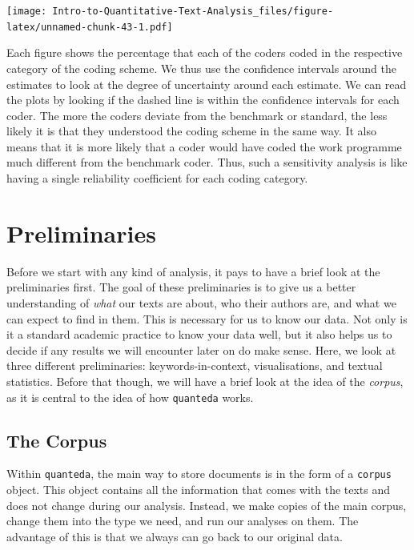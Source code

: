 \documentclass[
]{article}
\begin{document}
\texttt{[image: Intro-to-Quantitative-Text-Analysis\_files/figure-latex/unnamed-chunk-43-1.pdf]}

Each figure shows the percentage that each of the coders coded in the respective category of the coding scheme. We thus use the confidence intervals around the estimates to look at the degree of uncertainty around each estimate. We can read the plots by looking if the dashed line is within the confidence intervals for each coder. The more the coders deviate from the benchmark or standard, the less likely it is that they understood the coding scheme in the same way. It also means that it is more likely that a coder would have coded the work programme much different from the benchmark coder. Thus, such a sensitivity analysis is like having a single reliability coefficient for each coding category.

\hypertarget{preliminaries}{%
\section{Preliminaries}\label{preliminaries}}

Before we start with any kind of analysis, it pays to have a brief look at the preliminaries first. The goal of these preliminaries is to give us a better understanding of \emph{what} our texts are about, who their authors are, and what we can expect to find in them. This is necessary for us to know our data. Not only is it a standard academic practice to know your data well, but it also helps us to decide if any results we will encounter later on do make sense. Here, we look at three different preliminaries: keywords-in-context, visualisations, and textual statistics. Before that though, we will have a brief look at the idea of the \emph{corpus}, as it is central to the idea of how \texttt{quanteda} works.

\hypertarget{the-corpus}{%
\subsection{The Corpus}\label{the-corpus}}

Within \texttt{quanteda}, the main way to store documents is in the form of a \texttt{corpus} object. This object contains all the information that comes with the texts and does not change during our analysis. Instead, we make copies of the main corpus, change them into the type we need, and run our analyses on them. The advantage of this is that we always can go back to our original data.
\end{document}
